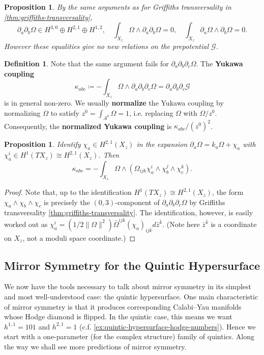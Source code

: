 \documentclass{report}
\theoremstyle{plain}
\newtheorem{proposition}[theorem]{Proposition}
\theoremstyle{definition}
\newtheorem{definition}[theorem]{Definition}
\theoremstyle{remark}
\newcommand{\di}{\partial}
\newcommand{\cG}{\mathcal{G}}
\begin{document}
\begin{proposition}
  By the same arguments as for Griffiths transversality in
  \ref{thm:griffiths-transversality},
  \[ \di_a \di_b \Omega \in H^{3,0} \oplus H^{2,1} \oplus H^{1,2}, \quad \int_{X_z} \Omega \wedge \di_a\di_b\Omega = 0, \quad \int_{X_z} \di_a \Omega \wedge \di_b \Omega = 0. \]
  However these equalities give no new relations on the prepotential
  $\cG$.
\end{proposition}

\begin{definition} \label{def:yukawa-coupling}
  Note that the same argument fails for $\di_a\di_b\di_c\Omega$. The
  {\bf Yukawa coupling}
  \[ \kappa_{abc} \coloneqq -\int_{X_z} \Omega \wedge \di_a\di_b\di_c\Omega = \di_a\di_b\di_c\cG \]
  is in general non-zero. We usually {\bf normalize} the Yukawa
  coupling by normalizing $\Omega$ to satisfy $z^0 = \int_{A^0}\Omega
  = 1$, i.e. replacing $\Omega$ with $\Omega/z^0$. Consequently, the
  {\bf normalized Yukawa coupling} is $\kappa_{abc}/(z^0)^2$.
\end{definition}

\begin{proposition}
  Identify $\chi_a \in H^{2,1}(X_z)$ in the expansion $\di_a\Omega =
  k_a \Omega + \chi_a$ with $\chi_a^i \in H^1(TX_z) \cong
  H^{2,1}(X_z)$. Then
  \[ \kappa_{abc} = -\int_{X_z} \Omega \wedge (\Omega_{ijk} \chi^i_a \wedge \chi^j_b \wedge \chi^k_c). \]
\end{proposition}

\begin{proof}
  Note that, up to the identification $H^1(TX_z) \cong H^{2,1}(X_z)$,
  the form $\chi_a \wedge \chi_b \wedge \chi_c$ is precisely the
  $(0,3)$-component of $\di_a\di_b\di_c\Omega$ by Griffiths
  transversality \ref{thm:griffiths-transversality}. The
  identification, however, is easily worked out as $\chi_a^i =
  (1/2\|\Omega\|^2) \bar{\Omega}^{ijk}(\chi_a)_{ij\bar{k}}
  d\bar{z}^{\bar{k}}$. (Note here $\bar{z}^{\bar{k}}$ is a coordinate
  on $X_z$, not a moduli space coordinate.)
\end{proof}

\subsection{Mirror Symmetry for the Quintic Hypersurface}

We now have the tools necessary to talk about mirror symmetry in its
simplest and most well-understood case: the quintic hypersurface. One
main characteristic of mirror symmetry is that it produces
corresponding Calabi--Yau manifolds whose Hodge diamond is flipped. In
the quintic case, this means we want $h^{1,1} = 101$ and $h^{2,1} = 1$
(c.f. \ref{ex:quintic-hypersurface-hodge-numbers}). Hence we start
with a one-parameter (for the complex structure) family of quintics.
Along the way we shall see more predictions of mirror symmetry.
\end{document}
